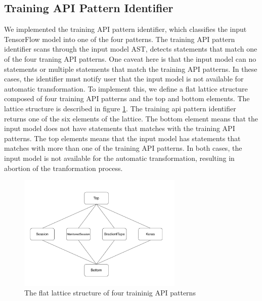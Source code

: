 \subsection{Training API Pattern Identifier}\label{sec:ident}

We implemented the training API pattern identifier, which classifies the
input TensorFlow model into one of the four patterns.
The training API pattern identifier scans through the input model AST,
detects statements that match one of the four traning API patterns.
One caveat here is that the input model can no statements or multiple statements
that match the training API patterns.
In these cases, the identifier must notify user that the
input model is not available for automatic transformation.
To implement this, we define a flat lattice structure composed of four 
training API patterns and the top and bottom elements.
The lattice structure is described in figure \ref{fig:pattern:lattice}.
The training api pattern identifier returns one of the six elements of
the lattice. The bottom element means that the input model does not have
statements that matches with the training API patterns.
The top elements means that the input model has statements that matches with
more than one of the training API patterns.
In both cases, the input model is not available for the automatic 
transformation, resulting in abortion of the tranformation process.

\begin{figure}[ht!]
  \centering
  \includegraphics[width=0.7\textwidth]{lattice.pdf}
  \caption{The flat lattice structure of four traininig API patterns}
  \label{fig:pattern:lattice}
\end{figure}



